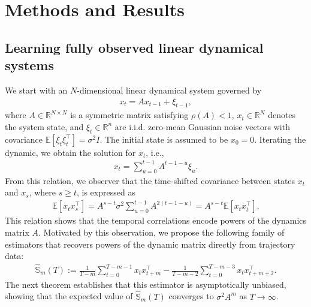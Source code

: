 \documentclass[11pt]{article}
\begin{document}
\section{Methods and Results}

\subsection{Learning  fully observed linear dynamical systems}
We start with an $N$-dimensional linear dynamical system governed by
\begin{align}
\label{eq: model}
x_t = A x_{t-1} + \xi_{t-1},
\end{align}
where $A \in \mathbb{R}^{N \times N}$ is a symmetric matrix  satisfying $\rho(A) < 1$, $x_t \in \mathbb{R}^N$ denotes the system state, and $\xi_t \in \mathbb{R}^n$ are i.i.d. zero-mean Gaussian noise vectors with covariance $\mathbb{E}[\xi_t\xi_t^\top] = \sigma^2 I$. The initial state is assumed to be $x_0 = 0$.
Iterating the dynamic, we obtain the solution for $x_t$, i.e.,
\begin{align}
\label{eq4}
x_t = \sum_{u=0}^{t-1} A^{t-1-u} \xi_u.
\end{align}
From this relation, we observer that the time-shifted covariance between states $x_t$ and $x_s$, where $s \geq t$, is expressed as
\begin{align}
\label{eq5}
\mathbb{E}[x_t x_s^\top]
= A^{s-t}  \sigma^2 \sum_{u=0}^{t-1} A^{2(t-1-u)}
= A^{s-t}  \mathbb{E}[x_t x_t^\top].
\end{align}
This relation shows that the temporal correlations encode powers of the dynamics matrix $A$. Motivated by this observation, we propose the following family of  estimators that recovers powers of the dynamic matrix directly from trajectory data:
\begin{align}
\label{eq: estimator}
\hat{\mathbb{S}}_{m} (T) := \frac{1}{T-m}\sum_{t=0}^{T-m-1}{x}_t{x}_{t+m}^\top - \frac{1}{T-m-2}\sum_{t=0}^{T-m-3}{x}_t{x}_{t+m+2}^\top.
\end{align}
The next theorem establishes that this estimator is asymptotically unbiased, showing that the expected value of $\hat{\mathbb{S}}_m (T)$ converges to $\sigma^2{A}^m$ as $T\rightarrow\infty$. 
\end{document}
